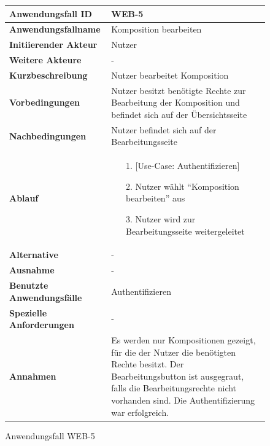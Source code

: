 \begin{figure}[h]
	\centering
	\begin{tabularx}{\textwidth}{ X | X }
		\textbf{Anwendungsfall ID} & WEB-5 \\ \hline
		\textbf{Anwendungsfallname} & Komposition bearbeiten \\ \hline
		\textbf{Initiierender Akteur} & Nutzer \\ \hline
		\textbf{Weitere Akteure} & - \\ \hline
		\textbf{Kurzbeschreibung} & Nutzer bearbeitet Komposition \\ \hline
		\textbf{Vorbedingungen} & Nutzer besitzt benötigte Rechte zur Bearbeitung der Komposition und befindet sich auf der Übersichtsseite \\ \hline
		\textbf{Nachbedingungen} & Nutzer befindet sich auf der Bearbeitungsseite \\ \hline
		\textbf{Ablauf} &
		\begin{enumerate}
			\item[1.] [Use-Case: Authentifizieren]
			\item[2.] Nutzer wählt ``Komposition bearbeiten'' aus
			\item[3.] Nutzer wird zur Bearbeitungsseite weitergeleitet
		\end{enumerate} \\ \hline
		\textbf{Alternative} & - \\ \hline
		\textbf{Ausnahme} & - \\ \hline
		\textbf{Benutzte Anwendungsfälle} & Authentifizieren \\ \hline
		\textbf{Spezielle Anforderungen} & - \\ \hline
		\textbf{Annahmen} & Es werden nur Kompositionen gezeigt, für die der Nutzer die benötigten Rechte besitzt.
                  Der Bearbeitungsbutton ist ausgegraut, falls die Bearbeitungsrechte nicht vorhanden sind. Die Authentifizierung war erfolgreich.
	\end{tabularx}
	\caption{Anwendungsfall WEB-5}
	\label{fig:anwendungsfall-server-tabelle-web-5}
\end{figure}

